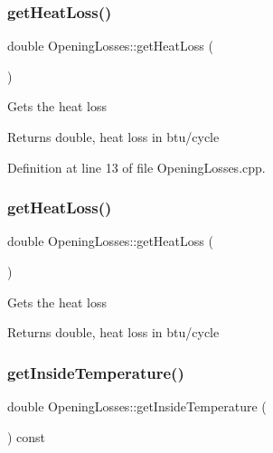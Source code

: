 \subsubsection{\texorpdfstring{get\+Heat\+Loss()}{getHeatLoss()}\hspace{0.1cm}{\footnotesize\ttfamily [2/3]}}
{\footnotesize\ttfamily double Opening\+Losses\+::get\+Heat\+Loss (\begin{DoxyParamCaption}{ }\end{DoxyParamCaption})}

Gets the heat loss

\begin{DoxyReturn}{Returns}
double, heat loss in btu/cycle 
\end{DoxyReturn}


Definition at line 13 of file Opening\+Losses.\+cpp.

\mbox{\label{class_opening_losses_a38112eb408f72e252b42a68a41a25d0f}} 
\subsubsection{\texorpdfstring{get\+Heat\+Loss()}{getHeatLoss()}\hspace{0.1cm}{\footnotesize\ttfamily [3/3]}}
{\footnotesize\ttfamily double Opening\+Losses\+::get\+Heat\+Loss (\begin{DoxyParamCaption}{ }\end{DoxyParamCaption})}

Gets the heat loss

\begin{DoxyReturn}{Returns}
double, heat loss in btu/cycle 
\end{DoxyReturn}
\mbox{\label{class_opening_losses_abe930dab77b1c855503ee51fdf66c88a}} 
\subsubsection{\texorpdfstring{get\+Inside\+Temperature()}{getInsideTemperature()}\hspace{0.1cm}{\footnotesize\ttfamily [1/3]}}
{\footnotesize\ttfamily double Opening\+Losses\+::get\+Inside\+Temperature (\begin{DoxyParamCaption}{ }\end{DoxyParamCaption}) const\hspace{0.3cm}{\ttfamily [inline]}}

